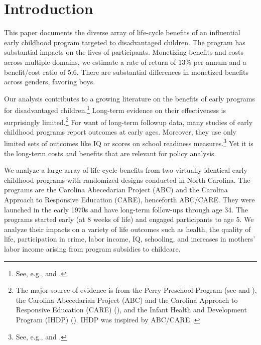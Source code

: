\clearpage

\restoregeometry
\doublespacing

\setcounter{page}{0}

\section{Introduction}

This paper documents the diverse array of life-cycle benefits of an influential early childhood program targeted to disadvantaged children. The program has substantial impacts on the lives of participants. Monetizing benefits and costs across multiple domains, we estimate a rate of return of 13\% per annum and a benefit/cost ratio of 5.6. There are substantial differences in monetized benefits across genders, favoring boys.

Our analysis contributes to a growing literature on the benefits of early programs for disadvantaged children.\footnote{See, e.g., \cite{Currie_2011_AER} and \cite{Elango_Hojman_etal_2016_Early-Edu}.} Long-term evidence on their effectiveness is surprisingly limited.\footnote{The major source of evidence is from the Perry Preschool Program (see \citealp{Schweinhart_Montie_ea_2005_BOOKlifetime} and \citealp{Heckman_Moon_etal_2010_RateofReturn,Heckman_Moon_etal_2010_QE}), the Carolina Abecedarian Project (ABC) and the Carolina Approach to Responsive Education (CARE) (\citealp{Ramey_Campbell_etal_2000_ADS,Ramey-etal_2012-ABC}), and the Infant Health and Development Program (IHDP) (\citealp{Gross_Spiker_etal_1997_BOOKHelpinglowbirth,Duncan_Sojourner_2013_JHR}). IHDP was inspired by ABC/CARE \citep[][]{Gross_Spiker_etal_1997_BOOKHelpinglowbirth}.} For want of long-term followup data, many studies of early childhood programs report outcomes at early ages. Moreover, they use only limited sets of outcomes like IQ or scores on school readiness measures.\footnote{See, e.g., \cite{Kline_Walters_2016_QJE} and \cite{Weiland_2013_CD_Impacts-of-Pre-K}.} Yet it is the long-term costs and benefits that are relevant for policy analysis.

We analyze a large array of life-cycle benefits from two virtually identical early childhood programs with randomized designs conducted in North Carolina. The programs are the Carolina Abecedarian Project (ABC) and the Carolina Approach to Responsive Education (CARE), henceforth ABC/CARE. They were launched in the early 1970s and have long-term follow-ups through age 34. The programs started early (at 8 weeks of life) and engaged participants to age 5. We analyze their impacts on a variety of life outcomes such as health, the quality of life, participation in crime, labor income, IQ, schooling, and increases in mothers' labor income arising from program subsidies to childcare.

